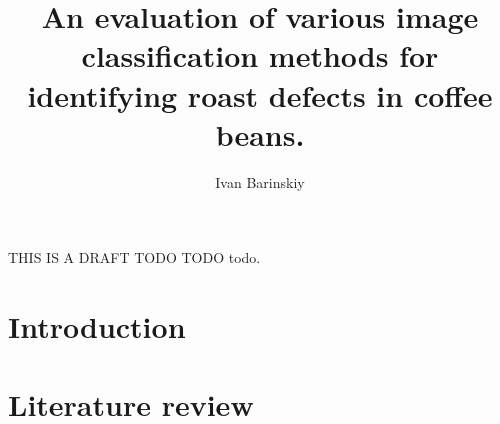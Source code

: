 \documentclass{./template/UoYCSproject}
\author{Ivan Barinskiy}
\title{An evaluation of various image classification methods for identifying roast defects in coffee beans.}
\begin{document}
\maketitle
\listoffigures
\listoftables

\begin{summary}
THIS IS A DRAFT TODO TODO todo.
\end{summary}

\chapter{Introduction}\label{ch:introduction}


\chapter{Literature review}\label{ch:litreview}


%
%
%

\printbibliography
\end{document}
